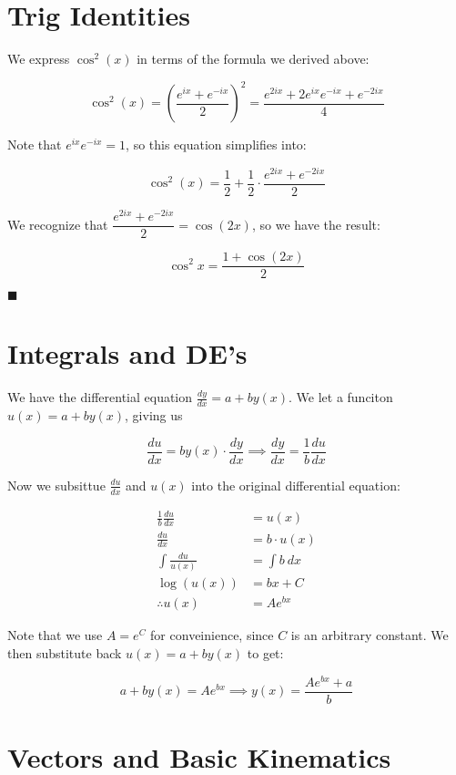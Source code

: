 \documentclass{article}
\theoremstyle{definition}
\numberwithin{equation}{section}
\numberwithin{definition}{section}
\begin{document}
\section{Trig Identities}

We express $\cos^2(x)$ in terms of the formula we derived above:


\[	\cos^2(x) = \left(\frac{e^{ix} + e^{-ix}}{2}\right)^2 = \frac{e^{2ix} + 2 e^{ix}e^{-ix} + e^{-2ix}}{4}\]

Note that $e^{ix} e^{-ix} = 1$, so this equation simplifies into:

\[ \cos^2(x) = \frac{1}{2} + \frac{1}{2} \cdot \frac{e^{2ix} + e^{-2ix}}{2}\]

We recognize that $\dfrac{e^{2ix} + e^{-2ix}}{2} = \cos(2x)$, so we have the result:

\[ \cos^2{x} = \frac{1 + \cos(2x)}{2}\]

$\blacksquare$


\section{Integrals and DE's}

We have the differential equation $\frac{dy}{dx} = a + by(x)$. We let a funciton $u(x) = a + by(x)$, giving us 

\[\frac{du}{dx} = by(x) \cdot \frac{dy}{dx} \implies \frac{dy}{dx} = \frac{1}{b} \frac{du}{dx}\]

Now we subsittue $\frac{du}{dx}$ and $u(x)$ into the original differential equation:

\begin{align*}
\frac{1}{b} \frac{du}{dx} &= u(x)\\
\frac{du}{dx} &= b\cdot u(x)\\
\int\frac{du}{u(x)} &= \int b \ dx\\
\log(u(x)) &= bx + C\\
\therefore u(x) &= Ae^{bx}
\end{align*}

Note that we use $A = e^C$ for conveinience, since $C$ is an arbitrary constant. We then substitute back $u(x) = a+ by(x)$ to get:

\[ a + by(x) = Ae^{bx} \implies y(x) = \frac{Ae^{bx} + a}{b}\]


\section{Vectors and Basic Kinematics}
\end{document}
